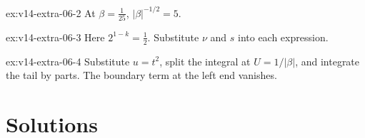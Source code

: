 \begin{hint}{ex:v14-extra-06-2}
At $\beta=\frac1{25}$, $|\beta|^{-1/2}=5$.
\end{hint}

\begin{hint}{ex:v14-extra-06-3}
Here $2^{1-k}=\frac12$. Substitute $\nu$ and $s$ into each expression.
\end{hint}

\begin{hint}{ex:v14-extra-06-4}
Substitute $u=t^2$, split the integral at $U=1/|\beta|$, and integrate the tail by parts. The boundary term at the left end vanishes.
\end{hint}

\section{Solutions}

